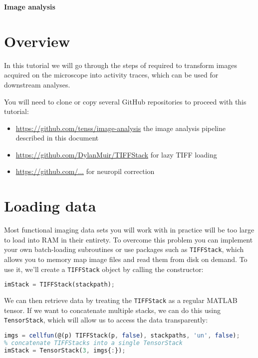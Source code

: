\documentclass[a4paper]{report}
\begin{document}
\addtocounter{exercises}{1}

\begin{center}
\textbf{\Large{Image analysis}}
\end{center}	
\section{Overview}
In this tutorial we will go through the steps of required to transform images acquired on the microscope into activity traces, which can be used for downstream analyses.

You will need to clone or copy several GitHub repositories to proceed with this tutorial:
\begin{itemize}
	\item \href{https://github.com/tenss/image-analysis}{https://github.com/tenss/image-analysis} the image analysis pipeline described in this document 
	\item \href{https://github.com/DylanMuir/TIFFStack}{https://github.com/DylanMuir/TIFFStack} for lazy TIFF loading 
	\item \href{https://github.com/...}{https://github.com/...} for neuropil correction
\end{itemize} 

\section{Loading data}
Most functional imaging data sets you will work with in practice will be too large to load into RAM in their entirety. 
To overcome this problem you can implement your own batch-loading subroutines or use packages such as \texttt{TIFFStack}, which allows you to memory map image files and read them from disk on demand. 
To use it, we'll create a \texttt{TIFFStack} object by calling the constructor:
\begin{lstlisting}[language=Octave]
imStack = TIFFStack(stackpath);
\end{lstlisting}
We can then retrieve data by treating the \texttt{TIFFStack} as a regular MATLAB tensor.
If we want to concatenate multiple stacks, we can do this using \texttt{TensorStack}, which will allow us to access the data transparently:
\begin{lstlisting}[language=Octave]
% create a TIFFStack for each file
imgs = cellfun(@(p) TIFFStack(p, false), stackpaths, 'un', false);
% concatenate TIFFStacks into a single TensorStack
imStack = TensorStack(3, imgs{:});
\end{lstlisting}
\end{document}
